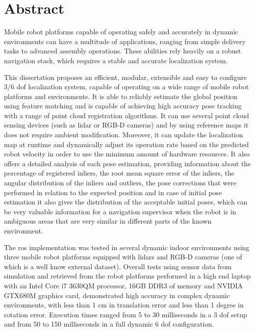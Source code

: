 \chapter*{Abstract}

Mobile robot platforms capable of operating safely and accurately in dynamic environments can have a multitude of applications, ranging from simple delivery tasks to advanced assembly operations. These abilities rely heavily on a robust navigation stack, which requires a stable and accurate localization system.

This dissertation proposes an efficient, modular, extensible and easy to configure 3/6 \gls{dof} localization system, capable of operating on a wide range of mobile robot platforms and environments. It is able to reliably estimate the global position using feature matching and is capable of achieving high accuracy pose tracking with a range of point cloud registration algorithms. It can use several point cloud sensing devices (such as \gls{lidar} or RGB-D cameras) and by using reference maps it does not require ambient modification. Moreover, it can update the localization map at runtime and dynamically adjust its operation rate based on the predicted robot velocity in order to use the minimum amount of hardware resources. It also offers a detailed analysis of each pose estimation, providing information about the percentage of registered inliers, the root mean square error of the inliers, the angular distribution of the inliers and outliers, the pose corrections that were performed in relation to the expected position and in case of initial pose estimation it also gives the distribution of the acceptable initial poses, which can be very valuable information for a navigation supervisor when the robot is in ambiguous areas that are very similar in different parts of the known environment.

The \gls{ros} implementation was tested in several dynamic indoor environments using three mobile robot platforms equipped with \glspl{lidar} and RGB-D cameras (one of which is a well know external dataset). Overall tests using sensor data from simulation and retrieved from the robot platforms performed in a high end laptop with an Intel Core i7 3630QM processor, 16GB DDR3 of memory and NVIDIA GTX680M graphics card, demonstrated high accuracy in complex dynamic environments, with less than 1 cm in translation error and less than 1 degree in rotation error. Execution times ranged from 5 to 30 milliseconds in a 3 \gls{dof} setup and from 50 to 150 milliseconds in a full dynamic 6 \gls{dof} configuration.

